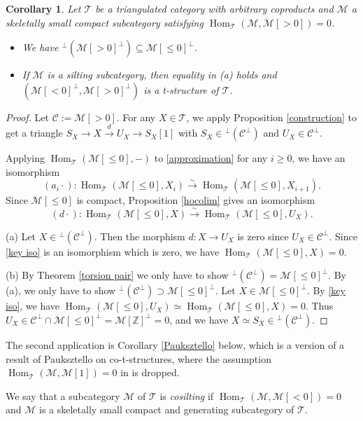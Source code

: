 \documentclass[a4paper,reqno]{amsart}
\newtheorem{corollary}[theorem]{Corollary}
\theoremstyle{definition}
\newcommand{\CC}{{\mathcal C}}
\newcommand{\TT}{{\mathcal T}}
\newcommand{\MM}{{\mathcal M}}
\newcommand{\Z}{\mathbb{Z}}
\newcommand{\Hom}{\operatorname{Hom}\nolimits}
\begin{document}
\begin{corollary}\label{HKM2}
Let $\TT$ be a triangulated category with arbitrary coproducts and $\MM$ a skeletally small compact subcategory satisfying $\Hom_{\TT}(\MM,\MM[>0])=0$.
\begin{itemize}
\item[(a)] We have ${}^\perp(\MM[>0]^\perp)\subseteq\MM[\le0]^\perp$.
\item[(b)] If $\MM$ is a silting subcategory, then equality in (a) holds and $(\MM[<0]^\perp,\MM[>0]^\perp)$ is a t-structure of $\TT$.
\end{itemize}
\end{corollary}

\begin{proof}
Let $\CC:=\MM[>0]$. For any $X\in\TT$, we apply Proposition \ref{construction} to get a triangle %
$S_X\to X\stackrel{d}{\to} U_X\to S_X[1]$ with $S_X\in{}^\perp(\CC^\perp)$ and $U_X\in\CC^\perp$.

Applying $\Hom_{\TT}(\MM[\le0],-)$ to \eqref{approximation} for any $i\ge0$, we have an isomorphism
\[(a_i\cdot):\Hom_{\TT}(\MM[\le0],X_i)\xrightarrow{\sim}\Hom_{\TT}(\MM[\le0],X_{i+1}).\]
Since $\MM[\le0]$ is compact, Proposition \ref{hocolim} gives an isomorphism
\begin{equation}\label{key iso}
(d\cdot):\Hom_{\TT}(\MM[\le0],X)\xrightarrow{\sim}\Hom_{\TT}(\MM[\le0],U_X).
\end{equation}

(a) Let $X\in{}^\perp(\CC^\perp)$. Then the morphism $d:X\to U_X$ is zero since $U_X\in\CC^\perp$.
Since \eqref{key iso} is an isomorphism which is zero, we have $\Hom_{\TT}(\MM[\le0],X)=0$.

(b) By Theorem \ref{torsion pair} we only have to show ${}^\perp(\CC^\perp)=\MM[\le0]^\perp$.
By (a), we only have to show ${}^\perp(\CC^\perp)\supset\MM[\le0]^\perp$.
Let $X\in\MM[\le0]^\perp$.
By \eqref{key iso}, we have $\Hom_{\TT}(\MM[\le0],U_X)\simeq\Hom_{\TT}(\MM[\le0],X)=0$.
Thus $U_X\in\CC^\perp\cap\MM[\le0]^\perp=\MM[\Z]^\perp=0$, and we have $X\simeq S_X\in{}^\perp(\CC^\perp)$.
\end{proof}

The second application is Corollary \ref{Pauksztello} below, which is
a version of a result of Pauksztello \cite{P1} on co-t-structures, where the assumption $\Hom_{\TT}(\MM,\MM[1])=0$ in \cite{P1} is dropped.

We say that a subcategory $\MM$ of $\TT$ is \emph{cosilting} if 
$\Hom_{\TT}(\MM,\MM[<0])=0$ and $\MM$ is a skeletally small compact and generating subcategory of $\TT$.
\end{document}

